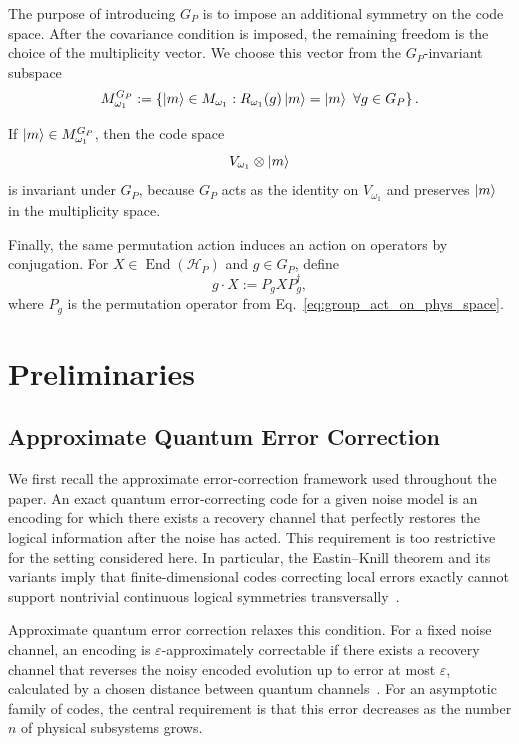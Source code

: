\documentclass[10pt,twocolumn,superscriptaddress,aps,amsmath,amssymb,citeautoscript,floatfix,prx,longbibliography]{revtex4-2}
\theoremstyle{plain}
\theoremstyle{plain}
\theoremstyle{plain}
\theoremstyle{plain}
\theoremstyle{plain}
\theoremstyle{plain}
\begin{document}
The purpose of introducing $G_P$ is to impose an additional symmetry on the code space. After the covariance condition is imposed, the remaining freedom is the choice of the multiplicity vector. We choose this vector from the $G_P$-invariant subspace
\begin{equation}\label{eq:g_inv_subspace}
M_{\omega_1}^{G_P}
:=
\left\{
    \ket m\in M_{\omega_1}
    :
    R_{\omega_1}(g)\ket m=\ket m
    \ \forall g\in G_P
\right\}.
\end{equation}

If $\ket m\in M_{\omega_1}^{G_P}$, then the code space
$$
V_{\omega_1}\otimes\ket m
$$
is invariant under $G_P$, because $G_P$ acts as the identity on $V_{\omega_1}$ and preserves $\ket m$ in the multiplicity space.

Finally, the same permutation action induces an action on operators by conjugation. For $X\in\operatorname{End}(\mathcal H_P)$ and $g\in G_P$, define
\begin{equation}\label{eq:group_act_oper}
g\cdot X
:=
P_gXP_g^\dagger,
\end{equation}
where $P_g$ is the permutation operator from Eq.~\eqref{eq:group_act_on_phys_space}.

\color{teal}

\section{Preliminaries}\label{sec:main_prelim}

\subsection{Approximate Quantum Error Correction}\label{subsec:main_AQEC}

We first recall the approximate error-correction framework used throughout the paper. An exact quantum error-correcting code for a given noise model is an encoding for which there exists a recovery channel that perfectly restores the logical information after the noise has acted. This requirement is too restrictive for the setting considered here. In particular, the Eastin--Knill theorem and its variants imply that finite-dimensional codes correcting local errors exactly cannot support nontrivial continuous logical symmetries transversally~\cite{Eastin2009}.

Approximate quantum error correction relaxes this condition. For a fixed noise channel, an encoding is $\varepsilon$-approximately correctable if there exists a recovery channel that reverses the noisy encoded evolution up to error at most $\varepsilon$, calculated by a chosen distance between quantum channels~\cite{Beny2010}. For an asymptotic family of codes, the central requirement is that this error decreases as the number $n$ of physical subsystems grows.
\end{document}
